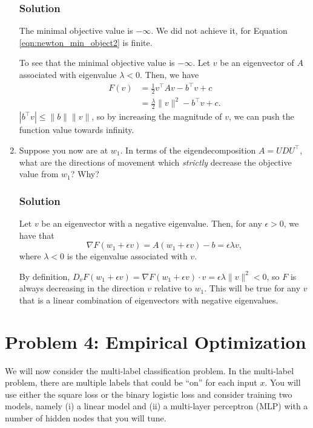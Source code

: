 \documentclass[letterpaper,11pt]{article}
\begin{document}
\begin{enumerate}
  \subsubsection*{Solution}

  The minimal objective value is $-\infty$. We did not achieve it, for Equation
  \ref{eqn:newton_min_object2} is finite.

  To see that the minimal objective value is $-\infty$. Let $v$ be an
  eigenvector of $A$ associated with eigenvalue $\lambda < 0$. Then, we have
  \begin{align*}
    F\left(v\right)
    &= \frac{1}{2}v^\intercal A v - b^\intercal v + c \\
    &= \frac{\lambda}{2}\lVert v \rVert^2 - b^\intercal v + c.
  \end{align*}
  $\left\lvert b^\intercal v \right\rvert \leq \lVert b \rVert \lVert v \rVert$,
  so by increasing the magnitude of $v$, we can push the function value towards
  infinity.
\item Suppose you now are at $w_1$. In terms of the eigendecomposition
  $A = UDU^\intercal$, what are the directions of movement which \emph{strictly}
  decrease the objective value from $w_1$? Why?

  \subsubsection*{Solution}

  Let $v$ be an eigenvector with a negative eigenvalue. Then, for any
  $\epsilon > 0$, we have that
  \begin{equation*}
    \nabla F(w_1 + \epsilon v) = A\left(w_1 + \epsilon v\right) - b = \epsilon\lambda v,
  \end{equation*}
  where $\lambda < 0$ is the eigenvalue associated with $v$.
  
  By definition,
  $D_vF(w_1 + \epsilon v) = \nabla F(w_1 + \epsilon v) \cdot v = \epsilon\lambda
  \lVert v\rVert^2 < 0$, so $F$ is always decreasing in the direction $v$
  relative to $w_1$. This will be true for any $v$ that is a linear combination
  of eigenvectors with negative eigenvalues.
\end{enumerate}

\section*{Problem 4: Empirical Optimization}

We will now consider the multi-label classification problem. In the multi-label
problem, there are multiple labels that could be ``on'' for each input $x$. You
will use either the square loss or the binary logistic loss and consider
training two models, namely (i) a linear model and (ii) a multi-layer perceptron
(MLP) with a number of hidden nodes that you will tune.
\end{document}
